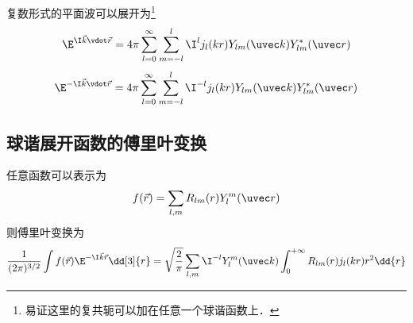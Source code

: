 

复数形式的平面波可以展开为\footnote{易证这里的复共轭可以加在任意一个球谐函数上．}
\begin{equation}
\E^{\I \vec k \vdot \vec r} = 4\pi \sum_{l=0}^{\infty} \sum_{m=-l}^l \I^l j_l(kr) Y_{lm}(\uvec k) Y_{lm}^*(\uvec r)
\end{equation}
\begin{equation}
\E^{-\I \vec k \vdot \vec r} = 4\pi \sum_{l=0}^{\infty} \sum_{m=-l}^l \I^{-l} j_l(kr) Y_{lm}(\uvec k) Y_{lm}^*(\uvec r)
\end{equation}

\subsection{球谐展开函数的傅里叶变换}

任意函数可以表示为
\begin{equation}
f(\vec r) = \sum_{l,m} R_{lm}(r) Y_l^m(\uvec r)
\end{equation}
则傅里叶变换为
\begin{equation}
\frac{1}{(2\pi)^{3/2}} \int f(\vec r) \E^{-\I \vec k \vec r} \dd[3]{r}
= \sqrt{\frac{2}{\pi}} \sum_{l,m} \I^{-l} Y_l^m(\uvec k) \int_0^{+\infty} R_{lm}(r) j_l(kr) r^2 \dd{r}
\end{equation}
